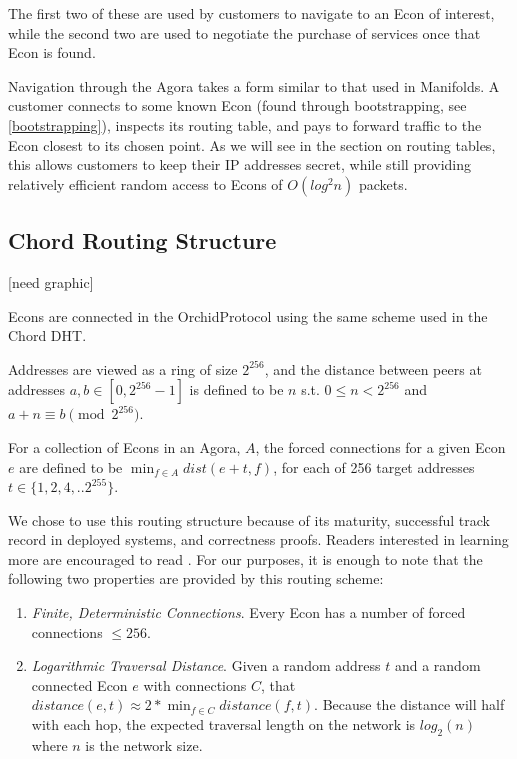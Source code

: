 \documentclass{article}
\newcommand{\orchid}{Orchid}
\newcommand{\Orchid}{\orchid}
\begin{document}
The first two of these are used by customers to navigate to an Econ of
interest, while the second two are used to negotiate the purchase of
services once that Econ is found.

Navigation through the Agora takes a form similar to that used in
Manifolds. A customer connects to some known Econ (found through
bootstrapping, see \ref{bootstrapping}), inspects its routing table,
and pays to forward traffic to the Econ closest to its chosen
point. As we will see in the section on routing tables, this allows
customers to keep their IP addresses secret, while still providing
relatively efficient random access to Econs of $O(log^2 n)$ packets.

\subsection{Chord Routing Structure}

[need graphic]

Econs are connected in the \Orchid Protocol using the same scheme used
in the Chord DHT.

Addresses are viewed as a ring of size $2^{256}$, and the distance
between peers at addresses $a, b \in [0, 2^{256}-1]$ is defined to be
$n$ s.t. $0 \leq n < 2^{256}$ and $a + n \equiv b \pmod{2^{256}}$.

For a collection of Econs in an Agora, $A$, the forced connections for
a given Econ $e$ are defined to be $\min_{f \in A} dist(e+t, f)$, for
each of 256 target addresses $t \in \{1, 2, 4, .. 2^{255}\}$.

We chose to use this routing structure because of its maturity,
successful track record in deployed systems, and correctness
proofs. Readers interested in learning more are encouraged to read
. For our purposes, it is enough to note that the following
two properties are provided by this routing scheme:

\begin{enumerate}
\item \emph{Finite, Deterministic Connections}. Every Econ has a
  number of forced connections $\leq 256$.
\item \emph{Logarithmic Traversal Distance}. Given a random address
  $t$ and a random connected Econ $e$ with connections $C$, that
  $distance(e, t) \approx 2 * \min_{f \in C} distance(f, t)$. Because
  the distance will half with each hop, the expected traversal length
  on the network is $log_2(n)$ where $n$ is the network size.
\end{enumerate}
\end{document}
